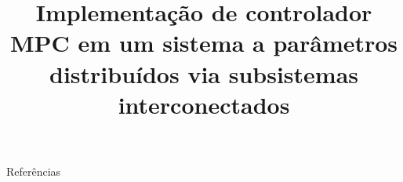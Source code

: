 \documentclass[abnt,pt]{slides}
\title{Implementação de controlador MPC em um sistema a parâmetros distribuídos via subsistemas interconectados}
\begin{document}
    \maketitle{}

    \begin{slide}
        \vfill\null{}
        \begin{minipage}[t][0.6\textheight][t]{.5\textwidth}
            \tableofcontents[sections={1-3}]
        \end{minipage}%
        \begin{minipage}[t][4\baselineskip][t]{.5\textwidth}
            \tableofcontents[sections={4-}]
        \end{minipage}
        \vfill\null{}
    \end{slide}

    
    

    \begin{frame}[allowframebreaks]{Referências}
        \nocite{*}
        \printbibliography{}
    \end{frame}
\end{document}
